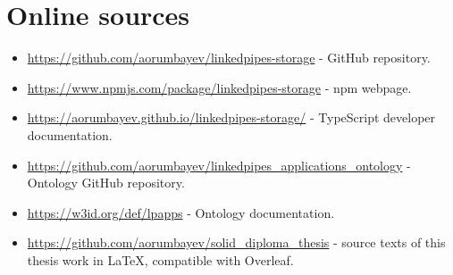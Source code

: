 \chapter{Online sources}
\label{att:online-sources}

\begin{itemize}
  \item \url{https://github.com/aorumbayev/linkedpipes-storage} - \lpas{} GitHub repository.
  \item \url{https://www.npmjs.com/package/linkedpipes-storage} - \lpas{} npm \newline{} webpage.
  \item \url{https://aorumbayev.github.io/linkedpipes-storage/} - \lpas{} \newline{}TypeScript developer documentation.
  \item \url{https://github.com/aorumbayev/linkedpipes_applications_ontology} - \lpas{} Ontology GitHub repository.
  \item \url{https://w3id.org/def/lpapps} - \lpas{} Ontology documentation.
  \item \url{https://github.com/aorumbayev/solid_diploma_thesis} - source texts of this thesis work in LaTeX, compatible with Overleaf.
  \end{itemize}